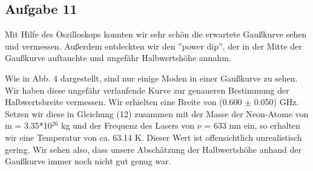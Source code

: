 \subsection{Aufgabe 11}

Mit Hilfe des Oszilloskops konnten wir sehr schön die erwartete Gaußkurve sehen und vermessen. Außerdem entdeckten wir den ''power dip'', der in der Mitte der Gaußkurve auftauchte und ungefähr Halbwertshöhe annahm. 


Wie in Abb. 4 dargestellt, sind nur einige Moden in einer Gaußkurve zu sehen. Wir haben diese ungefähr verlaufende Kurve zur genaueren Bestimmung der Halbwertsbreite vermessen. Wir erhielten eine Breite von (0.600 $\pm$ 0.050) GHz. Setzen wir diese in Gleichung (12) zusammen mit der Masse der Neon-Atome von m = 3.35*10$^{26}$ kg und der Frequenz des Lasers von $\nu$ = 633 nm ein, so erhalten wir eine Temperatur von ca. 63.14 K. Dieser Wert ist offensichtlich unrealistisch gering. Wir sehen also, dass unsere Abschätzung der Halbwertshöhe anhand der Gaußkurve immer noch nicht gut genug war.

